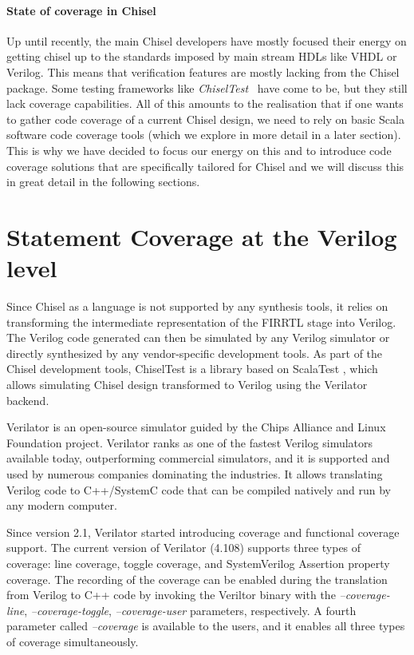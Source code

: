 \documentclass[conference]{IEEEtran}
\begin{document}
\paragraph{State of coverage in Chisel} Up until recently, the main Chisel developers have mostly focused their energy on getting chisel up to the standards imposed by main stream HDLs like VHDL or Verilog. This means that verification features are mostly lacking from the Chisel package. Some testing frameworks like \textit{ChiselTest}~\cite{chisel:tester2} have come to be, but they still lack coverage capabilities. All of this amounts to the realisation that if one wants to gather code coverage of a current Chisel design, we need to rely on basic Scala software code coverage tools (which we explore in more detail in a later section). This is why we have decided to focus our energy on this and to introduce code coverage solutions that are specifically tailored for Chisel and we will discuss this in great detail in the following sections.

\section{Statement Coverage at the Verilog level}
Since Chisel as a language is not supported by any synthesis tools, it relies on transforming the intermediate representation of the FIRRTL stage into Verilog.  The Verilog code generated can then be simulated by any Verilog simulator or directly synthesized by any vendor-specific development tools. As part of the Chisel development tools, ChiselTest is a library based on ScalaTest \cite{ScalaTest}, which allows simulating Chisel design transformed to Verilog using the Verilator \cite{verilator} backend.

Verilator is an open-source simulator guided by the Chips Alliance and Linux Foundation project. Verilator ranks as one of the fastest Verilog simulators available today, outperforming commercial simulators, and it is supported and used by numerous companies dominating the industries. It allows translating Verilog code to C++/SystemC code that can be compiled natively and run by any modern computer.

Since version 2.1, Verilator started introducing coverage and functional coverage support. The current version of Verilator (4.108) supports three types of coverage: line coverage, toggle coverage, and SystemVerilog Assertion property coverage. The recording of the coverage can be enabled during the translation from Verilog to C++ code by invoking the Veriltor binary with the \textit{--coverage-line}, \textit{--coverage-toggle}, \textit{--coverage-user} parameters, respectively. A fourth parameter called \textit{--coverage} is available to the users, and it enables all three types of coverage simultaneously.
\end{document}
